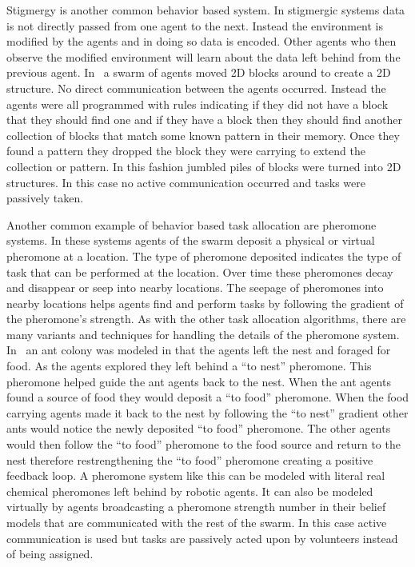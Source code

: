 Stigmergy is another common behavior based system.  In stigmergic systems data is not directly passed from one agent to the next.  Instead the environment is modified by the agents and in doing so data is encoded.  Other agents who then observe the modified environment will learn about the data left behind from the previous agent.  In~\cite{stigmergy_building} a swarm of agents moved 2D blocks around to create a 2D structure.  No direct communication between the agents occurred.  Instead the agents were all programmed with rules indicating if they did not have a block that they should find one and if they have a block then they should find another collection of blocks that match some known pattern in their memory.  Once they found a pattern they dropped the block they were carrying to extend the collection or pattern.  In this fashion jumbled piles of blocks were turned into 2D structures.  In this case no active communication occurred and tasks were passively taken.

Another common example of behavior based task allocation are pheromone systems.  In these systems agents of the swarm deposit a physical or virtual pheromone at a location.  The type of pheromone deposited indicates the type of task that can be performed at the location.  Over time these pheromones decay and disappear or seep into nearby locations.  The seepage of pheromones into nearby locations helps agents find and perform tasks by following the gradient of the pheromone's strength.  As with the other task allocation algorithms, there are many variants and techniques for handling the details of the pheromone system.  In~\cite{pheromone} an ant colony was modeled in that the agents left the nest and foraged for food.  As the agents explored they left behind a ``to nest'' pheromone.  This pheromone helped guide the ant agents back to the nest.  When the ant agents found a source of food they would deposit a ``to food'' pheromone.  When the food carrying agents made it back to the nest by following the ``to nest'' gradient other ants would notice the newly deposited ``to food'' pheromone.  The other agents would then follow the ``to food'' pheromone to the food source and return to the nest therefore restrengthening the ``to food'' pheromone creating a positive feedback loop.  A pheromone system like this can be modeled with literal real chemical pheromones left behind by robotic agents.  It can also be modeled virtually by agents broadcasting a pheromone strength number in their belief models that are communicated with the rest of the swarm.  In this case active communication is used but tasks are passively acted upon by volunteers instead of being assigned.
